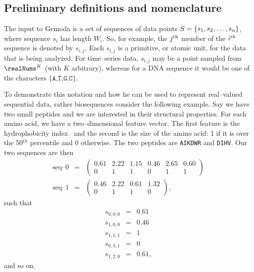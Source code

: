    \subsection{Preliminary definitions and nomenclature}

    The input to Gemoda is a set of sequences of
    data points $S=\left\{s_1,s_2,\ldots,s_n\right\}$, where
    sequence $s_i$ has length $W_i$.  So, for example,
    the ${j^{\textrm{th}}}$ member of the ${i^{\textrm{th}}}$ sequence
    is denoted by $s_{i,j}$.  Each $s_{i,j}$ is a
    primitive, or atomic unit, for the data that is
    being analyzed.  For time--series data, $s_{i,j}$
    may be a point sampled from $\realNums^{K}$ (with
    $K$ arbitrary), whereas for a DNA sequence it would
    be one of the characters $\{\texttt{A,T,G,C}\}$.

        To demonstrate this notation and how he can be used to
        represent real--valued sequential data, rather biosequences
        consider the following example.
        Say we have two small peptides and we are interested in their
        structural properties.  For each amino acid, we have a two--dimensional
        feature vector.  The first feature is the hydrophobicity index~\cite{argos1982structural}
        and the second is the size of the amino acid: 1 if it is over the
        50$^{th}$ percentile and 0 otherwise.  The two peptides are \texttt{AIKDWR}
        and \texttt{DIHV}\@.  Our two sequences are then
        \begin{eqnarray*}
            \text{seq--0} & = & \begin{pmatrix}
                        0.61 & 2.22 & 1.15 & 0.46 & 2.65 & 0.60\\
                        0 & 1 & 1 & 0 & 1 & 1
                    \end{pmatrix} \\
            \text{seq--1} & = & \begin{pmatrix}
                        0.46 & 2.22 & 0.61 & 1.32 \\
                        0 & 1 & 1 & 0
                    \end{pmatrix},
        \end{eqnarray*}
        such that
        \begin{eqnarray*}
            s_{0,0,0} & = & 0.61 \\
            s_{1,0,0} & = & 0.46 \\
            s_{1,1,1} & = & 1 \\
            s_{0,3,1} & = & 0 \\
            s_{1,2,0} & = & 0.61,
        \end{eqnarray*}
        and so on.

